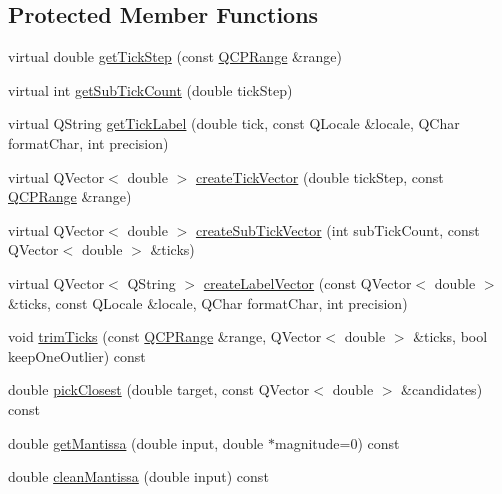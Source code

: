 \subsection*{Protected Member Functions}
\begin{DoxyCompactItemize}
\item 
virtual double \hyperlink{class_q_c_p_axis_ticker_a910d69bcec2de37e92d8d4e1ecf201e2}{get\+Tick\+Step} (const \hyperlink{class_q_c_p_range}{Q\+C\+P\+Range} \&range)
\item 
virtual int \hyperlink{class_q_c_p_axis_ticker_a4ccc403ced7a1457ce6ba293509933c8}{get\+Sub\+Tick\+Count} (double tick\+Step)
\item 
virtual Q\+String \hyperlink{class_q_c_p_axis_ticker_a8201eb4aa8be192bf786b126eb5ee089}{get\+Tick\+Label} (double tick, const Q\+Locale \&locale, Q\+Char format\+Char, int precision)
\item 
virtual Q\+Vector$<$ double $>$ \hyperlink{class_q_c_p_axis_ticker_af4645a824c7bd2ca8fc7e86ebf9055bd}{create\+Tick\+Vector} (double tick\+Step, const \hyperlink{class_q_c_p_range}{Q\+C\+P\+Range} \&range)
\item 
virtual Q\+Vector$<$ double $>$ \hyperlink{class_q_c_p_axis_ticker_a9a6435723fa0bd366d1ea4c2cff7c33f}{create\+Sub\+Tick\+Vector} (int sub\+Tick\+Count, const Q\+Vector$<$ double $>$ \&ticks)
\item 
virtual Q\+Vector$<$ Q\+String $>$ \hyperlink{class_q_c_p_axis_ticker_a804050e408f37a0b9770c6654ebe6aa7}{create\+Label\+Vector} (const Q\+Vector$<$ double $>$ \&ticks, const Q\+Locale \&locale, Q\+Char format\+Char, int precision)
\item 
void \hyperlink{class_q_c_p_axis_ticker_ab28cc1ab549489be7975f5ce7e717916}{trim\+Ticks} (const \hyperlink{class_q_c_p_range}{Q\+C\+P\+Range} \&range, Q\+Vector$<$ double $>$ \&ticks, bool keep\+One\+Outlier) const
\item 
double \hyperlink{class_q_c_p_axis_ticker_a4ea0a7c4ca1c610f92b9bd5944ab4260}{pick\+Closest} (double target, const Q\+Vector$<$ double $>$ \&candidates) const
\item 
double \hyperlink{class_q_c_p_axis_ticker_a2f1e223bafbf2cec7c3ba8b08d5c77e8}{get\+Mantissa} (double input, double $\ast$magnitude=0) const
\item 
double \hyperlink{class_q_c_p_axis_ticker_ac7df6c72876b7abd67c932663a0b0f6a}{clean\+Mantissa} (double input) const
\end{DoxyCompactItemize}
